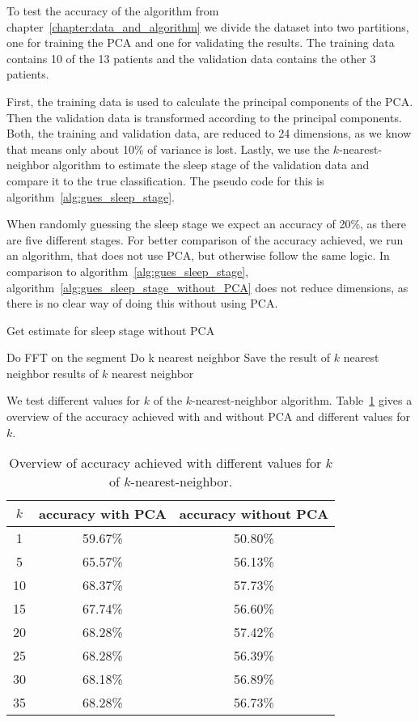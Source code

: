 To test the accuracy of the algorithm from chapter~\ref{chapter:data_and_algorithm} we divide the dataset into two partitions, one for training the PCA and one for validating the results. The training data contains 10 of the 13 patients and the validation data contains the other 3 patients.

First, the training data is used to calculate the principal components of the PCA. Then the validation data is transformed according to the principal components. Both, the training and validation data, are reduced to 24 dimensions, as we know that means only about 10\% of variance is lost. Lastly, we use the $k$-nearest-neighbor algorithm to estimate the sleep stage of the validation data and compare it to the true classification. The pseudo code for this is algorithm~\ref{alg:gues_sleep_stage}.

When randomly guessing the sleep stage we expect an accuracy of 20\%, as there are five different stages. For better comparison of the accuracy achieved, we run an algorithm, that does not use PCA, but otherwise follow the same logic. In comparison to algorithm~\ref{alg:gues_sleep_stage}, algorithm~\ref{alg:gues_sleep_stage_without_PCA} does not reduce dimensions, as there is no clear way of doing this without using PCA.

\begin{algorithm}[h]
	\caption{Get estimate for sleep stage without PCA}\label{alg:gues_sleep_stage_without_PCA}
	\begin{algorithmic}
		\State Do FFT on the segment
		\State Do k nearest neighbor
		\State Save the result of $k$ nearest neighbor
		\EndFor
		\State \Return results of $k$ nearest neighbor
	\end{algorithmic}
\end{algorithm}

We test different values for $k$ of the $k$-nearest-neighbor algorithm. Table~\ref{tab:error_validation_overview} gives a overview of the accuracy achieved with and without PCA and different values for $k$.

\begin{table}[h]
	\centering
	\begin{tabular}{c|c|c}
		$k$ & accuracy with PCA & accuracy without PCA \\
		\hline
		1  & 59.67\% & 50.80\% \\
		5  & 65.57\% & 56.13\% \\
		10 & 68.37\% & 57.73\% \\
		15 & 67.74\% & 56.60\% \\
		20 & 68.28\% & 57.42\% \\
		25 & 68.28\% & 56.39\% \\
		30 & 68.18\% & 56.89\% \\
		35 & 68.28\% & 56.73\% \\
	\end{tabular}
	\caption{Overview of accuracy achieved with different values for $k$ of $k$-nearest-neighbor.}
	\label{tab:error_validation_overview}
\end{table}

